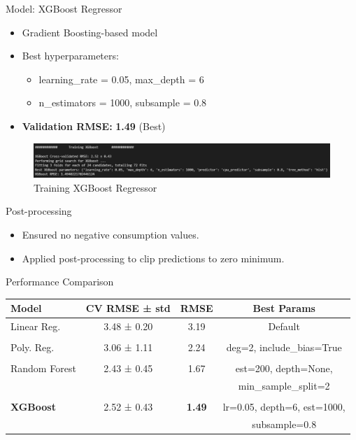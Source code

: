 \documentclass{beamer}
\begin{document}
\begin{frame}{Model: XGBoost Regressor}
  \begin{itemize}
    \item Gradient Boosting-based model
    \item Best hyperparameters:
    \begin{itemize}
        \item learning\_rate = 0.05, max\_depth = 6
        \item n\_estimators = 1000, subsample = 0.8
    \end{itemize}
    \item \textbf{Validation RMSE:} \textbf{1.49} (Best)
  \end{itemize}
  \begin{figure}
\vfill
    \centering
    \includegraphics[width=0.6\linewidth]{images/xgboost.png}
    \caption{Training XGBoost Regressor}
    \label{fig:enter-label}
\end{figure}
\end{frame}

\begin{frame}{Post-processing}
  \begin{itemize}
    \item Ensured no negative consumption values.
    \item Applied post-processing to clip predictions to zero minimum.
  \end{itemize}
\end{frame}

\begin{frame}{Performance Comparison}
\small
    \begin{tabular}{lccc}
        \toprule
        \textbf{Model} & \textbf{CV RMSE ± std} & \textbf{RMSE} & \textbf{Best Params} \\
        \midrule
        Linear Reg. & 3.48 ± 0.20 & 3.19 & Default \\
        &&&\\
        Poly. Reg. & 3.06 ± 1.11 & 2.24 & deg=2, include\_bias=True \\
        &&&\\
        Random Forest & 2.43 ± 0.45 & 1.67 & est=200, depth=None, \\ &&&min\_sample\_split=2 \\
        &&&\\
        \textbf{XGBoost} & 2.52 ± 0.43 & \textbf{1.49} & lr=0.05, depth=6, est=1000,\\ &&&subsample=0.8\\
        \bottomrule
    \end{tabular}
\end{frame}
\end{document}
